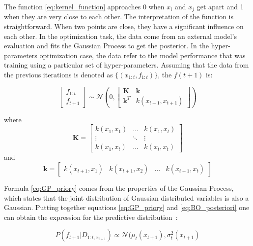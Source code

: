 The function \ref{eq:kernel_function} approaches $0$ when $x_i$ and $x_j$ get apart and 1 when they are very close to each other. The interpretation of the function is straightforward. When two points are close, they have a significant influence on each other. In the optimization task, the data come from an external model's evaluation and fits the Gaussian Process to get the posterior. In the hyper-parameters optimization case, the data refer to the model performance that was training using a particular set of hyper-parameters.     
Assuming that the data from the previous iterations is denoted as $\{ (x_{1:t}, f_{1:t}) \}$, the $f(t+1)$ is:

\begin{equation}
\label{eq:GP_priory}
    \begin{bmatrix}
         f_{1:t} \\
         f_{t+1}
        \end{bmatrix}  \sim  \mathcal{N}  \left( 0,  \begin{bmatrix}
         \mathbf{K} & \mathbf{k}  \\
         \mathbf{k}^{T} &  k(x_{t+1},x_{t+1})
        \end{bmatrix}  \right)  
\end{equation}

where 
\begin{equation}
    \mathbf{K} = \begin{bmatrix}
         k(x_{1},x_1) & \ldots  &  k(x_{1},x_t)  \\
          \vdots & \ddots & \vdots \\
           k(x_{1},x_t) & \ldots  &  k(x_{t},x_t)
        \end{bmatrix}
\end{equation}
and
\begin{equation}
    \mathbf{k} = \begin{bmatrix}
        k(x_{t+1},x_1) &  k(x_{t+1},x_2) &  \ldots & k(x_{t+1},x_t) 
        \end{bmatrix}
\end{equation}

Formula \ref{eq:GP_priory} comes from the properties of the Gaussian Process, which states that the joint distribution of Gaussian distributed variables is also a Gaussian. Putting together equations \ref{eq:GP_priory} and \ref{eq:BO_posteriori} one can obtain the expression for the predictive distribution~\cite{GaussianProcesses}: 

\begin{equation}
    P(f_{t+1}|D_{1:t, x_{t+1}}) \propto \mathcal{N} (\mu_{t}(x_{t+1}), \sigma_{t}^{2}(x_{t+1}) 
\end{equation}

